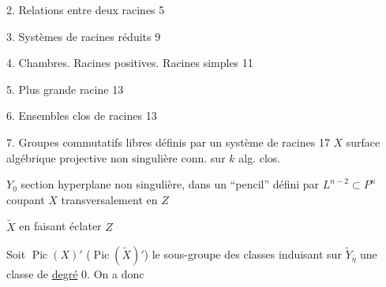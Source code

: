 2. Relations entre deux racines \dotfill{} 5

3. Systèmes de racines réduits \dotfill{} 9

4. Chambres. Racines positives. Racines simples \dotfill{} 11

5. Plus grande racine \dotfill{} 13

6. Ensembles clos de racines \dotfill{} 13

7. Groupes commutatifs libres définis par un système de racines \dotfill{} 17
$X$ surface  algébrique projective non singulière conn.
sur $k$ alg. clos.

$Y_0$ section hyperplane non singulière, dans un
``pencil'' défini par $L^{n-2}\subset P^n$ coupant $X$
transversalement en $Z$

$\widetilde X$  en faisant éclater $Z$



Soit $\operatorname{Pic}(X)'$ ($\operatorname{Pic}(\widetilde X)'$) le sous-groupe des
 classes induisant sur $\widetilde Y_{\bar\eta}$ une classe
de \uline{degré} $0$. On a donc

